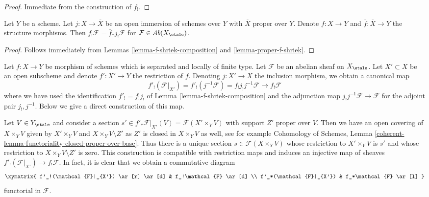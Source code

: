 \begin{proof}
Immediate from the construction of $f_!$.
\end{proof}

\begin{lemma}
\label{lemma-compactify-f-shriek-separated}
Let $Y$ be a scheme. Let $j : X \to \overline{X}$ be an open
immersion of schemes over $Y$ with $\overline{X}$ proper over $Y$.
Denote $f : X \to Y$
and $\overline{f} : \overline{X} \to Y$ the structure morphisms.
Then $f_!\mathcal{F} = \overline{f}_*j_!\mathcal{F}$
for $\mathcal{F} \in \textit{Ab}(X_\etale)$.
\end{lemma}

\begin{proof}
Follows immediately from
Lemmas \ref{lemma-f-shriek-composition} and \ref{lemma-proper-f-shriek}.
\end{proof}

\begin{remark}
\label{remark-covariance-f-shriek-separated}
Let $f : X \to Y$ be morphism of schemes which is separated and
locally of finite type. Let $\mathcal{F}$ be an abelian sheaf on $X_\etale$.
Let $X' \subset X$ be an open subscheme and denote $f' : X' \to Y$
the restriction of $f$. Denoting $j : X' \to X$ the inclusion morphism,
we obtain a canonical map
$$
f'_!(\mathcal{F}|_{X'}) =
f'_!(j^{-1}\mathcal{F}) = f_!j_!j^{-1}\mathcal{F}
\longrightarrow
f_!\mathcal{F}
$$
where we have used the identification $f'_! = f_!j_!$ of
Lemma \ref{lemma-f-shriek-composition}
and the adjunction map $j_!j^{-1}\mathcal{F} \to \mathcal{F}$ for the adjoint
pair $j_!, j^{-1}$. Below we give a direct construction of this map.

\medskip\noindent
Let $V \in Y_\etale$ and consider a section
$s' \in f'_*\mathcal{F}|_{X'}(V) = \mathcal{F}(X' \times_Y V)$
with support $Z'$ proper over $V$. Then we have an open covering
of $X \times_Y V$ given by $X' \times_Y V$ and $X \times_Y V \setminus Z'$
as $Z'$ is closed in $X \times_Y V$ as well,
see for example Cohomology of Schemes, Lemma
\ref{coherent-lemma-functoriality-closed-proper-over-base}.
Thus there is a unique section $s \in \mathcal{F}(X \times_Y V)$
whose restriction to $X' \times_Y V$ is $s'$ and whose restriction
to $X \times_Y V \setminus Z'$ is zero. This construction is
compatible with restriction maps and induces an injective map of sheaves
$f'_!(\mathcal{F}|_{X'}) \to f_!\mathcal{F}$. In fact, it is
clear that we obtain a commutative diagram
$$
\xymatrix{
f'_!(\mathcal{F}|_{X'}) \ar[r] \ar[d] &
f_!\mathcal{F} \ar[d] \\
f'_*(\mathcal{F}|_{X'}) &
f_*\mathcal{F} \ar[l]
}
$$
functorial in $\mathcal{F}$.
\end{remark}

